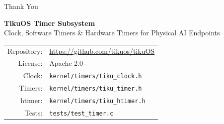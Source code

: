 \documentclass[aspectratio=169, 10pt]{beamer}
\begin{document}
\begin{frame}{Thank You}
\begin{center}
\Large\textbf{TikuOS Timer Subsystem}\\[0.5em]
\normalsize Clock, Software Timers \& Hardware Timers for Physical AI Endpoints\\[1.5em]

\begin{tabular}{rl}
  Repository: & \url{https://github.com/tikuos/tikuOS} \\
  License:    & Apache 2.0 \\
  Clock:      & \texttt{kernel/timers/tiku\_clock.h} \\
  Timers:     & \texttt{kernel/timers/tiku\_timer.h} \\
  htimer:     & \texttt{kernel/timers/tiku\_htimer.h} \\
  Tests:      & \texttt{tests/test\_timer.c} \\
\end{tabular}
\end{center}
\end{frame}
\end{document}
